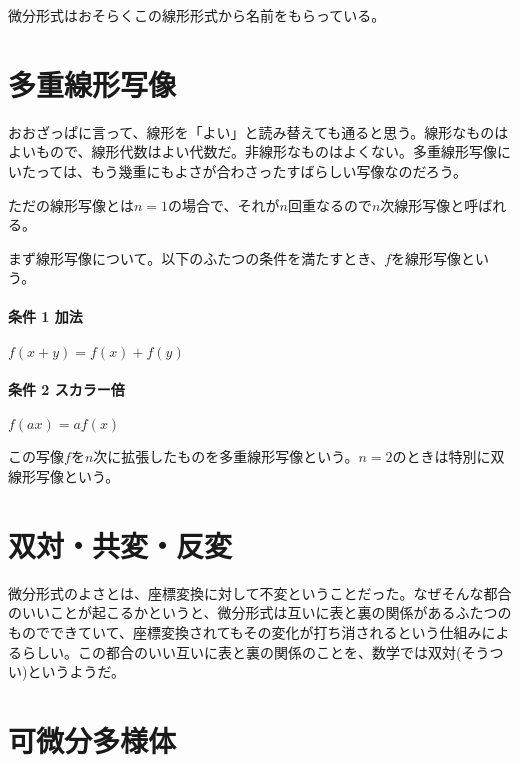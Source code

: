 微分形式はおそらくこの線形形式から名前をもらっている。

\newpage


\section{多重線形写像}

おおざっぱに言って、線形を「よい」と読み替えても通ると思う。線形なものはよいもので、線形代数はよい代数だ。非線形なものはよくない。多重線形写像にいたっては、もう幾重にもよさが合わさったすばらしい写像なのだろう。

ただの線形写像とは$n=1$の場合で、それが$n$回重なるので$n$次線形写像と呼ばれる。

\hrulefill

まず線形写像について。以下のふたつの条件を満たすとき、$ f $を線形写像という。

\paragraph{条件 1 加法}

$ f(x + y) = f(x) + f(y) $

\paragraph{条件 2 スカラー倍}

$ f(ax) = a f(x) $

この写像$f$を$n$次に拡張したものを多重線形写像という。$n=2$のときは特別に双線形写像という。

\newpage


\section{双対・共変・反変}

微分形式のよさとは、座標変換に対して不変ということだった。なぜそんな都合のいいことが起こるかというと、微分形式は互いに表と裏の関係があるふたつのものでできていて、座標変換されてもその変化が打ち消されるという仕組みによるらしい。この都合のいい互いに表と裏の関係のことを、数学では双対(そうつい)というようだ。

\newpage


\section{可微分多様体}

